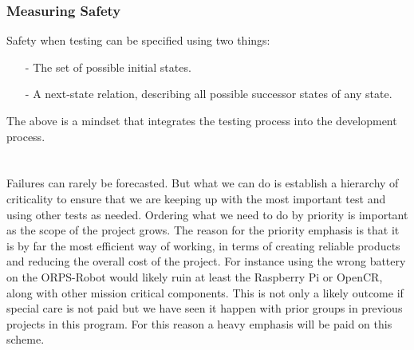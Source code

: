 \documentclass[english,12pt]{article}
\begin{document}
\subsubsection{Measuring Safety}
Safety when testing can be specified using two things:\\
\begin{itemize}
    \item[-] The set of possible initial states.
    \item[-] A next-state relation, describing all possible successor states of any state. 
\end{itemize}
The above is a mindset that integrates the testing process into the development process.\\\\\\
Failures can rarely be forecasted. But what we can do is establish a hierarchy of 
criticality to ensure that we are keeping up with the most important test and using 
other tests as needed. Ordering what we need to do by priority is important as the scope 
of the project grows. The reason for the priority emphasis is that it is by far 
the most efficient way of working, in terms of creating reliable products and reducing 
the overall cost of the project. For instance using the wrong battery on the ORPS-Robot 
would likely ruin at least the Raspberry Pi or OpenCR, along with other mission critical 
components. This is not only a likely outcome if special care is not paid but we have seen it 
happen with prior groups in previous projects in this program. For this reason a heavy emphasis 
will be paid on this scheme.
\end{document}
